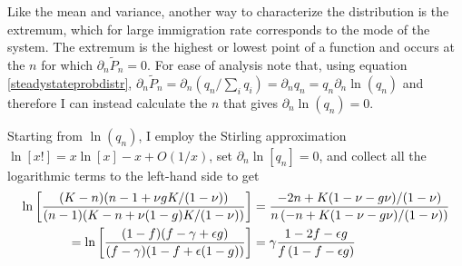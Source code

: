 Like the mean and variance, another way to characterize the distribution is the extremum, which for large immigration rate corresponds to the mode of the system. 
The extremum is the highest or lowest point of a function and occurs at the $n$ for which $\partial_n \widetilde{P}_n = 0$. 
For ease of analysis note that, using equation \ref{steadystateprobdistr}, $\partial_n \widetilde{P}_n = \partial_n \left( q_n/\sum_i q_i \right) = \partial_n q_n = q_n \partial_n \ln(q_n)$ and therefore I can instead calculate the $n$ that gives $\partial_n \ln(q_n)=0$. 
\iffalse
First,
\begin{align}
 \ln(q_n) &= 2\ln[K] - \ln\big[n(K-n)(1-\nu)+(1-g)n K\nu\big] + \ln[(K-n)!] + \ln\big[\left(n-1+\frac{\nu g K}{1-\nu}\right)!\big] \\
 		  &\, + \ln\big[\left(K-n+\frac{\nu (1-g) K}{1-\nu}\right)!\big] - \ln[(K-n)!] - \ln[(n-1)!] - \ln\big[\left(\frac{\nu g K}{1-\nu}\right)!\big] - \ln\big[\left(K-1+\frac{\nu (1-g) K}{1-\nu}\right)!\big] . \notag%
\end{align}
\fi
Starting from $\ln(q_n)$, I employ the Stirling approximation $\ln[x!] = x\ln[x] - x + O(1/x)$, set $\partial_n \ln[q_n]=0$, and collect all the logarithmic terms to the left-hand side to get
\iffalse
\begin{align}
 \ln\left[ \frac{(K-n)(n-1+\nu g K/(1-\nu))}{(n-1)(K-n+\nu(1-g)K/(1-\nu))}\right]  &= \frac{-2n+K(1-\nu-g\nu)/(1-\nu)}{n\left(-n+K(1-\nu-g\nu)/(1-\nu)\right)} \notag \\
=\ln\left[ \frac{(1-f)(f-\gamma+\epsilon g)}{(f-\gamma)(1-f+\epsilon(1-g))}\right] &= \gamma\frac{1-2f-\epsilon g}{f\left(1-f-\epsilon g\right)}
\end{align}
